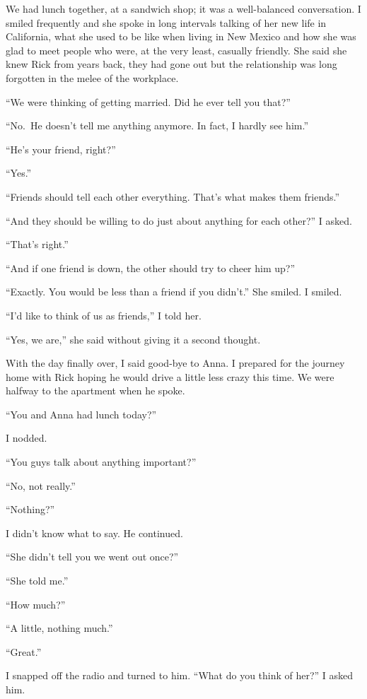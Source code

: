 \documentclass[
]{article}
\begin{document}
We had lunch together, at a sandwich shop; it was a well-balanced
conversation. I smiled frequently and she spoke in long intervals
talking of her new life in California, what she used to be like when
living in New Mexico and how she was glad to meet people who were, at
the very least, casually friendly. She said she knew Rick from years
back, they had gone out but the relationship was long forgotten in the
melee of the workplace.

``We were thinking of getting married. Did he ever tell you that?''

``No.~He doesn't tell me anything anymore. In fact, I hardly see him.''

``He's your friend, right?''

``Yes.''

``Friends should tell each other everything. That's what makes them
friends.''

``And they should be willing to do just about anything for each other?''
I asked.

``That's right.''

``And if one friend is down, the other should try to cheer him up?''

``Exactly. You would be less than a friend if you didn't.'' She smiled.
I smiled.

``I'd like to think of us as friends,'' I told her.

``Yes, we are,'' she said without giving it a second thought.

With the day finally over, I said good-bye to Anna. I prepared for the
journey home with Rick hoping he would drive a little less crazy this
time. We were halfway to the apartment when he spoke.

``You and Anna had lunch today?''

I nodded.

``You guys talk about anything important?''

``No, not really.''

``Nothing?''

I didn't know what to say. He continued.

``She didn't tell you we went out once?''

``She told me.''

``How much?''

``A little, nothing much.''

``Great.''

I snapped off the radio and turned to him. ``What do you think of her?''
I asked him.
\end{document}
